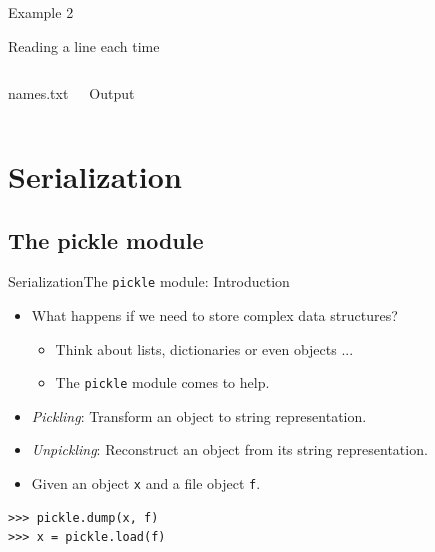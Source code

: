 \documentclass[10pt,compress]{beamer} %
\begin{document}
\begin{frame}[fragile]{Example 2}{}
	\begin{block}{Reading a line each time}
	\vspace{-0.2cm}
	
	\vspace{-0.2cm}
	\end{block}
	\begin{columns}
	\begin{block}{names.txt}
	
	\end{block}
	\begin{block}{Output}
	
	\end{block}
	\end{columns}
	
\end{frame}

\section{Serialization}
\subsection{The pickle module}

\begin{frame}[fragile]{Serialization}{The \texttt{pickle} module: Introduction}
	\begin{itemize}
		\item What happens if we need to store complex data structures?
		\begin{itemize}
			\item Think about lists, dictionaries or even objects ...
			\item The \texttt{pickle} module comes to help.
		\end{itemize}
		\item \textit{Pickling}: Transform an object to string representation.
		\item \textit{Unpickling}: Reconstruct an object from its string representation.
		\item Given an object \texttt{x} and a file object \texttt{f}.
	\end{itemize}
\begin{verbatim}
>>> pickle.dump(x, f)
>>> x = pickle.load(f)
\end{verbatim}
\end{frame}
\end{document}
